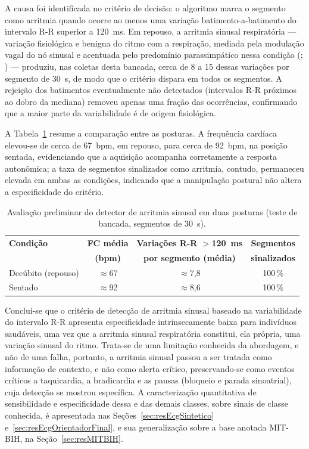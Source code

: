 A causa foi identificada no critério de decisão: o algoritmo marca o segmento como arritmia quando ocorre ao menos uma variação batimento-a-batimento do intervalo R-R superior a 120~ms. Em repouso, a arritmia sinusal respiratória — variação fisiológica e benigna do ritmo com a respiração, mediada pela modulação vagal do nó sinusal e acentuada pelo predomínio parassimpático nessa condição (; ) — produziu, nas coletas desta bancada, cerca de 8 a 15 dessas variações por segmento de 30~s, de modo que o critério dispara em todos os segmentos. A rejeição dos batimentos eventualmente não detectados (intervalos R-R próximos ao dobro da mediana) removeu apenas uma fração das ocorrências, confirmando que a maior parte da variabilidade é de origem fisiológica.

A Tabela~\ref{tab:arritmiaPostura} resume a comparação entre as posturas. A frequência cardíaca elevou-se de cerca de 67~bpm, em repouso, para cerca de 92~bpm, na posição sentada, evidenciando que a aquisição acompanha corretamente a resposta autonômica; a taxa de segmentos sinalizados como arritmia, contudo, permaneceu elevada em ambas as condições, indicando que a manipulação postural não altera a especificidade do critério.

\begin{table}[htb]
\centering
\caption{Avaliação preliminar do detector de arritmia sinusal em duas posturas (teste de bancada, segmentos de 30~s).}
\label{tab:arritmiaPostura}
\begin{tabular}{l c c c}
\hline
\textbf{Condição} & \textbf{FC média} & \textbf{Variações R-R $>$120~ms} & \textbf{Segmentos} \\
                  & \textbf{(bpm)}    & \textbf{por segmento (média)}    & \textbf{sinalizados} \\
\hline
Decúbito (repouso) & $\approx$67 & $\approx$7,8 & 100\,\% \\
Sentado            & $\approx$92 & $\approx$8,6 & 100\,\% \\
\hline
\end{tabular}
\end{table}

Conclui-se que o critério de detecção de arritmia sinusal baseado na variabilidade do intervalo R-R apresenta especificidade intrinsecamente baixa para indivíduos saudáveis, uma vez que a arritmia sinusal respiratória constitui, ela própria, uma variação sinusal do ritmo. Trata-se de uma limitação conhecida da abordagem, e não de uma falha, portanto, a arritmia sinusal passou a ser tratada como informação de contexto, e não como alerta crítico, preservando-se como eventos críticos a taquicardia, a bradicardia e as pausas (bloqueio e parada sinoatrial), cuja detecção se mostrou específica. A caracterização quantitativa de sensibilidade e especificidade dessa e das demais classes, sobre sinais de classe conhecida, é apresentada nas Seções~\ref{sec:resEcgSintetico} e~\ref{sec:resEcgOrientadorFinal}, e sua generalização sobre a base anotada MIT-BIH, na Seção~\ref{sec:resMITBIH}.

